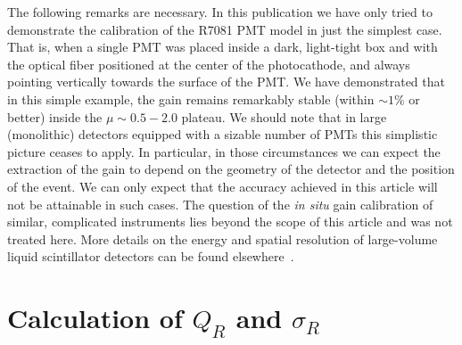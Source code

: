 \documentclass[a4paper,11pt]{article}
\begin{document}
The following remarks are necessary. 
In this publication we have only tried to demonstrate the calibration of the R7081 PMT model in just the simplest case. 
That is, when a single PMT was placed inside a dark, light-tight box and with the optical fiber positioned at the center of the photocathode, and always pointing vertically towards the surface of the PMT. 
We have demonstrated that in this simple example, the gain remains remarkably stable (within $\sim 1\%$ or better) inside the $\mu \sim 0.5 - 2.0$ plateau. 
We should note that in large (monolithic) detectors equipped with a sizable number of PMTs this simplistic picture ceases to apply. 
In particular, in those circumstances we can expect the extraction of the gain to depend on the geometry of the detector and the position of the event. 
 We can only expect that the accuracy achieved in this article will not be attainable in such cases.
The question of the \emph{in situ} gain calibration of similar, complicated instruments lies beyond the scope of this article and was not treated here. 
More details on the energy and spatial resolution of large-volume liquid scintillator detectors can be found elsewhere~\cite{smirnov}. 


\appendix
%

\section{Calculation of $Q_R$ and $\sigma_R$}
\label{appA}
\end{document}
